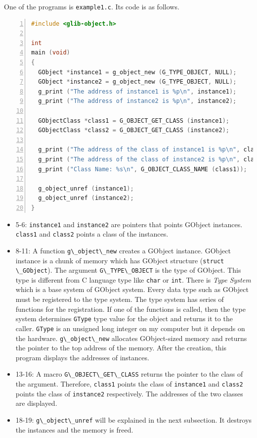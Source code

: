 One of the programs is \passthrough{\lstinline!example1.c!}. Its code is
as follows.

\begin{lstlisting}[language=C, numbers=left]
#include <glib-object.h>

int
main (void)
{
  GObject *instance1 = g_object_new (G_TYPE_OBJECT, NULL);
  GObject *instance2 = g_object_new (G_TYPE_OBJECT, NULL);
  g_print ("The address of instance1 is %p\n", instance1);
  g_print ("The address of instance2 is %p\n", instance2);

  GObjectClass *class1 = G_OBJECT_GET_CLASS (instance1);
  GObjectClass *class2 = G_OBJECT_GET_CLASS (instance2);

  g_print ("The address of the class of instance1 is %p\n", class1);
  g_print ("The address of the class of instance2 is %p\n", class2);
  g_print ("Class Name: %s\n", G_OBJECT_CLASS_NAME (class1));

  g_object_unref (instance1);
  g_object_unref (instance2);
}
\end{lstlisting}

\begin{itemize}
\tightlist
\item
  5-6: \passthrough{\lstinline!instance1!} and
  \passthrough{\lstinline!instance2!} are pointers that points GObject
  instances. \passthrough{\lstinline!class1!} and
  \passthrough{\lstinline!class2!} points a class of the instances.
\item
  8-11: A function \passthrough{\lstinline!g\_object\_new!} creates a
  GObject instance. GObject instance is a chunk of memory which has
  GObject structure (\passthrough{\lstinline!struct \_GObject!}). The
  argument \passthrough{\lstinline!G\_TYPE\_OBJECT!} is the type of
  GObject. This type is different from C language type like
  \passthrough{\lstinline!char!} or \passthrough{\lstinline!int!}. There
  is \emph{Type System} which is a base system of GObject system. Every
  data type such as GObject must be registered to the type system. The
  type system has series of functions for the registration. If one of
  the functions is called, then the type system determines
  \passthrough{\lstinline!GType!} type value for the object and returns
  it to the caller. \passthrough{\lstinline!GType!} is an unsigned long
  integer on my computer but it depends on the hardware.
  \passthrough{\lstinline!g\_object\_new!} allocates GObject-sized
  memory and returns the pointer to the top address of the memory. After
  the creation, this program displays the addresses of instances.
\item
  13-16: A macro \passthrough{\lstinline!G\_OBJECT\_GET\_CLASS!} returns
  the pointer to the class of the argument. Therefore,
  \passthrough{\lstinline!class1!} points the class of
  \passthrough{\lstinline!instance1!} and
  \passthrough{\lstinline!class2!} points the class of
  \passthrough{\lstinline!instance2!} respectively. The addresses of the
  two classes are displayed.
\item
  18-19: \passthrough{\lstinline!g\_object\_unref!} will be explained in
  the next subsection. It destroys the instances and the memory is
  freed.
\end{itemize}


